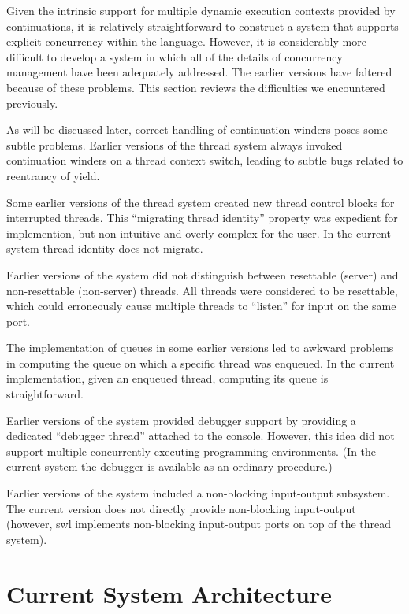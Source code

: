 \documentclass{article}
\begin{document}
Given the intrinsic support for multiple dynamic execution contexts
provided by continuations, it is relatively straightforward to
construct a system that supports explicit concurrency within the
language. However, it is considerably more difficult to develop a
system in which all of the details of concurrency management have been
adequately addressed.  The earlier versions have faltered because of
these problems. This section reviews the difficulties we encountered
previously.

As will be discussed later, correct handling of continuation winders
poses some subtle problems. Earlier versions of the thread system
always invoked continuation winders on a thread context switch,
leading to subtle bugs related to reentrancy of {\sf yield}.

Some earlier versions of the thread system created new thread control
blocks for interrupted threads.  This ``migrating thread identity''
property was expedient for implemention, but non-intuitive and overly
complex for the user.  In the current system thread identity does not
migrate.

Earlier versions of the system did not distinguish between resettable
(server) and non-resettable (non-server) threads.  All threads were
considered to be resettable, which could erroneously cause multiple
threads to ``listen'' for input on the same port.

The implementation of queues in some earlier versions led to awkward
problems in computing the queue on which a specific thread was
enqueued.  In the current implementation, given an enqueued thread,
computing its queue is straightforward.

Earlier versions of the system provided debugger support by providing
a dedicated ``debugger thread'' attached to the console.  However,
this idea did not support multiple concurrently executing programming
environments.  (In the current system the debugger is available as an
ordinary procedure.)

Earlier versions of the system included a non-blocking input-output
subsystem.  The current version does not directly provide non-blocking
input-output (however, {\sc swl} implements non-blocking input-output ports
on top of the thread system).



\section{Current System Architecture}
\end{document}
